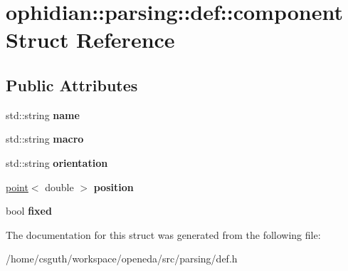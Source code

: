 \hypertarget{structophidian_1_1parsing_1_1def_1_1component}{\section{ophidian\-:\-:parsing\-:\-:def\-:\-:component Struct Reference}
\label{structophidian_1_1parsing_1_1def_1_1component}
}
\subsection*{Public Attributes}
\begin{DoxyCompactItemize}
\item 
\hypertarget{structophidian_1_1parsing_1_1def_1_1component_a36b71560879259e442572a322a5d6a8e}{std\-::string {\bfseries name}}\label{structophidian_1_1parsing_1_1def_1_1component_a36b71560879259e442572a322a5d6a8e}

\item 
\hypertarget{structophidian_1_1parsing_1_1def_1_1component_a52cd7893ccf46c7c515f9ba4e23edb6f}{std\-::string {\bfseries macro}}\label{structophidian_1_1parsing_1_1def_1_1component_a52cd7893ccf46c7c515f9ba4e23edb6f}

\item 
\hypertarget{structophidian_1_1parsing_1_1def_1_1component_a41b777c0bea65b98d9d66e8d7e4b11d7}{std\-::string {\bfseries orientation}}\label{structophidian_1_1parsing_1_1def_1_1component_a41b777c0bea65b98d9d66e8d7e4b11d7}

\item 
\hypertarget{structophidian_1_1parsing_1_1def_1_1component_a479e30b857b7da51f91dfb6dcb68ab02}{\hyperlink{structophidian_1_1parsing_1_1def_1_1point}{point}$<$ double $>$ {\bfseries position}}\label{structophidian_1_1parsing_1_1def_1_1component_a479e30b857b7da51f91dfb6dcb68ab02}

\item 
\hypertarget{structophidian_1_1parsing_1_1def_1_1component_a0006294429498a586416454bb521a2f0}{bool {\bfseries fixed}}\label{structophidian_1_1parsing_1_1def_1_1component_a0006294429498a586416454bb521a2f0}

\end{DoxyCompactItemize}


The documentation for this struct was generated from the following file\-:\begin{DoxyCompactItemize}
\item 
/home/csguth/workspace/openeda/src/parsing/def.\-h\end{DoxyCompactItemize}
